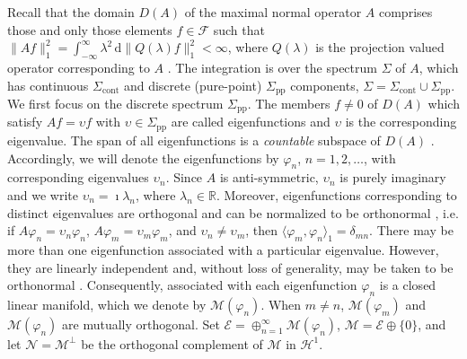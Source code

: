 \documentclass[11pt]{amsart}
\renewcommand{\d}{\mathrm{d}}
\newcommand{\Sigc}{\Sigma_{\text{cont}}}
\newcommand{\Sigp}{\Sigma_{\text{pp}}}
\newcommand{\Hc}{\mathcal{H}}
\newcommand{\Fc}{\mathcal{F}}
\newcommand{\Ec}{\mathcal{E}}
\renewcommand{\Mc}{\mathcal{M}}
\newcommand{\Nc}{\mathcal{N}}
\begin{document}
Recall that the domain $D(A)$ of the maximal normal operator $A$
comprises those and only those elements $f\in\Fc$ such that
$\|Af\|_1^2=\int_{-\infty}^\infty\lambda^2\,\d\|Q(\lambda)f\|_1^2<\infty$, where $Q(\lambda)$ is the
projection valued operator corresponding to $A$ \cite{Stone:64}. The
integration is over the spectrum $\Sigma$ of $A$, which has continuous
$\Sigc$ and discrete (pure-point) $\Sigp$ components,
$\Sigma=\Sigc\cup\Sigp$. We first focus on the discrete spectrum $\Sigp$. The
members $f\neq0$ of $D(A)$ which satisfy $Af=\upsilon f$ with $\upsilon\in\Sigp$ are
called eigenfunctions and $\upsilon$ is the corresponding eigenvalue. The
span of all eigenfunctions is a \emph{countable} subspace of $D(A)$
\cite{Reed-1980,Stone:64}. Accordingly, we will denote the
eigenfunctions by $\varphi_n$, $n=1,2,\ldots$, with corresponding eigenvalues
$\upsilon_n$. Since $A$ is anti-symmetric, $\upsilon_n$ is purely imaginary
\cite{Stone:64,Horn_Johnson-1990} and we write $\upsilon_n=\imath\lambda_n$, where
$\lambda_n\in\mathbb{R}$.  Moreover, eigenfunctions corresponding to distinct
eigenvalues are orthogonal and can be normalized to be orthonormal
\cite{Stone:64}, i.e. if $A\varphi_n=\upsilon_n\varphi_n$, $A\varphi_m=\upsilon_m\varphi_m$, and $\upsilon_n\neq\upsilon_m$,
then $\langle\varphi_m,\varphi_n\rangle_1=\delta_{mn}$. There may be more than one eigenfunction
associated with a particular eigenvalue. However, they are linearly
independent and, without loss of generality, may be taken
to be orthonormal \cite{Stone:64}. Consequently, associated with each
eigenfunction $\varphi_n$ is a closed linear manifold, which we denote
by $\Mc(\varphi_n)$. When $m\neq n$, $\Mc(\varphi_m)$ and $\Mc(\varphi_n)$ are mutually
orthogonal. Set $\Ec=\oplus_{n=1}^\infty\Mc(\varphi_n)$, $\Mc=\Ec\oplus\{0\}$, and let
$\Nc=\Mc^\perp$ be the orthogonal complement of $\Mc$ in $\Hc^1$.  
\end{document}
